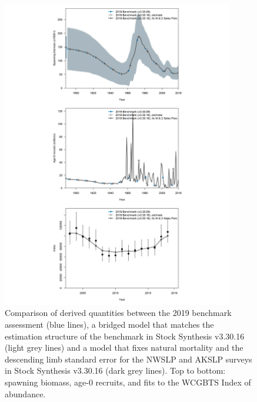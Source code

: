 \documentclass[11pt,
  english,
  a4paper,
]{article}
\begin{document}
\begin{figure}
\centering
\includegraphics[width=0.9\textwidth,height=0.9\textheight]{figs/bridging_panel.png}
\caption{Comparison of derived quantities between the 2019 benchmark assessment (blue lines), a bridged model that matches the estimation structure of the benchmark in Stock Synthesis v3.30.16 (light grey lines) and a model that fixes natural mortality and the descending limb standard error for the NWSLP and AKSLP surveys in Stock Synthesis v3.30.16 (dark grey lines). Top to bottom: spawning biomass, age-0 recruits, and fits to the WCGBTS Index of abundance. \label{fig:bridgingpanel}}
\end{figure}

\tagmcend\tagstructend

\end{document}
